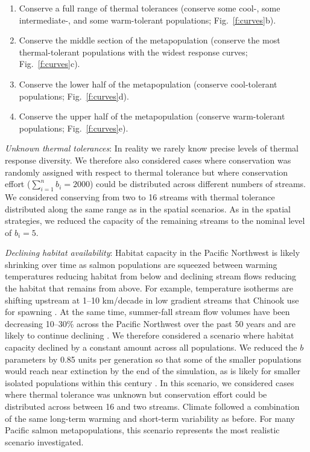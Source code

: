 \documentclass[12pt,english]{article}
\begin{document}
\begin{spacing}{1.9}
\begin{enumerate}
\def\labelenumi{\arabic{enumi}.}
\item
  Conserve a full range of thermal tolerances (conserve some cool-, some intermediate-, and some warm-tolerant populations; Fig.~\ref{f:curves}b).
\item
  Conserve the middle section of the metapopulation (conserve the most thermal-tolerant populations with the widest response curves; Fig.~\ref{f:curves}c).
\item
  Conserve the lower half of the metapopulation (conserve cool-tolerant populations; Fig.~\ref{f:curves}d).
\item
  Conserve the upper half of the metapopulation (conserve warm-tolerant populations; Fig.~\ref{f:curves}e).
\end{enumerate}

\emph{Unknown thermal tolerances}: In reality we rarely know precise levels of thermal response diversity. We therefore also considered cases where conservation was randomly assigned with respect to thermal tolerance but where conservation effort ($\sum\limits_{i=1}^n b_i = 2000$) could be distributed across different numbers of streams. We considered conserving from two to 16 streams with thermal tolerance distributed along the same range as in the spatial scenarios. As in the spatial strategies, we reduced the capacity of the remaining streams to the nominal level of $b_i = 5$.

\emph{Declining habitat availability}: Habitat capacity in the Pacific Northwest is likely shrinking over time as salmon populations are squeezed between warming temperatures reducing habitat from below and declining stream flows reducing the habitat that remains from above. For example, temperature isotherms are shifting upstream at 1--10 km/decade in low gradient streams that Chinook use for spawning \citep{isaak2013}. At the same time, summer-fall stream flow volumes have been decreasing 10--30\% across the Pacific Northwest over the past 50 years \citep{luce2009} and are likely to continue declining \citep{luce2013}. We therefore considered a scenario where habitat capacity declined by a constant amount across all populations. We reduced the $b$ parameters by 0.85 units per generation so that some of the smaller populations would reach near extinction by the end of the simulation, as is likely for smaller isolated populations within this century \citep[e.g.][]{gustafson2007}. In this scenario, we considered cases where thermal tolerance was unknown but conservation effort could be distributed across between 16 and two streams. Climate followed a combination of the same long-term warming and short-term variability as before. For many Pacific salmon metapopulations, this scenario represents the most realistic scenario investigated.


\end{spacing}
\end{document}
